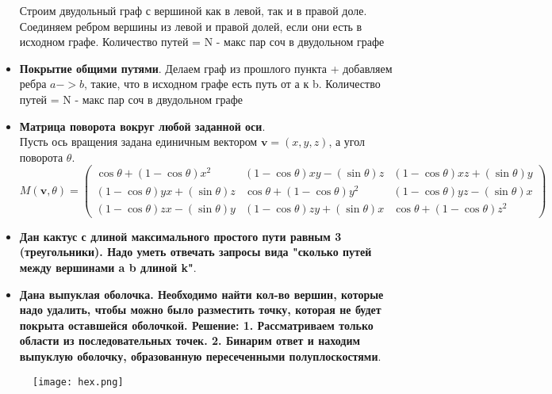 \documentclass[10pt]{article}
\begin{document}
\begin{itemize}
Строим двудольный граф с вершиной как в левой, так и в правой доле.
Соединяем ребром вершины из левой и правой долей, если они есть в исходном графе.
Количество путей = N - макс пар соч в двудольном графе
\item \textbf{Покрытие общими путями}.
Делаем граф из прошлого пункта + добавляем ребра $a->b$, такие, что
в исходном графе есть путь от а к b. Количество путей = N - макс пар соч в двудольном графе
\item \textbf{Матрица поворота вокруг любой заданной оси}.\\
Пусть ось вращения задана единичным вектором $\mathbf{v} = (x,y,z)$, а угол поворота $\theta$.
\begin{equation*}
  M(\mathbf{v}, \theta) = \left(
  \begin{array}{cccc}
  \cos{\theta} + (1 - \cos{\theta})x^2 & (1 - \cos{\theta})xy - (\sin{\theta})z & (1 - \cos{\theta})xz + (\sin{\theta})y\\
  (1 - \cos{\theta})yx + (\sin{\theta})z & \cos{\theta} + (1 - \cos{\theta})y^2 & (1 - \cos{\theta})yz - (\sin{\theta})x\\
  (1 - \cos{\theta})zx - (\sin{\theta})y & (1 - \cos{\theta})zy + (\sin{\theta})x & \cos{\theta} + (1 - \cos{\theta})z^2
  \end{array}
  \right)
\end{equation*}
\newpage
\item \textbf{Дан кактус с длиной максимального простого пути равным 3 (треугольники). 
Надо уметь отвечать запросы вида "сколько путей между вершинами a b длиной k"}.
\begin{multicols}{2}

\end{multicols}
\item \textbf{Дана выпуклая оболочка. Необходимо найти кол-во вершин, которые надо удалить,
чтобы можно было разместить точку, которая не будет покрыта оставшейся оболочкой.\newline
Решение: 
1. Рассматриваем только области из последовательных точек.
2. Бинарим ответ и находим выпуклую оболочку, образованную пересеченными полуплоскостями}.
\begin{multicols}{2}

\end{multicols}
\end{itemize}
\newpage
\begin{figure}[h]

  \centering
  
  \texttt{[image: hex.png]}
  
  \label{fig:mpr}
  
  \end{figure}
\end{document}
